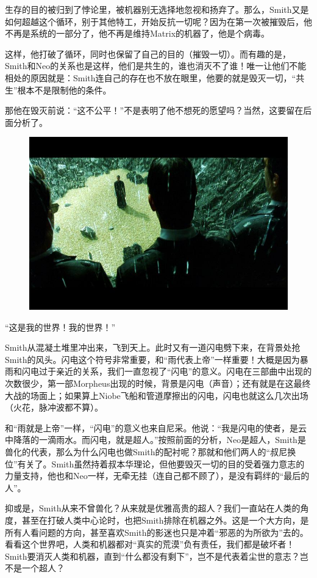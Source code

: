 \documentclass[UTF8]{ctexart}
\begin{document}
生存的目的被归到了悖论里，被机器别无选择地忽视和扬弃了。那么，Smith又是如何超越这个循环，别于其他特工，开始反抗一切呢？因为在第一次被摧毁后，他不再是系统的一部分了，他不再是维持Matrix的机器了，他是个病毒。

这样，他打破了循环，同时也保留了自己的目的（摧毁一切）。而有趣的是，Smith和Neo的关系也是这样，他们是共生的，谁也消灭不了谁！唯一让他们不能相处的原因就是：Smith连自己的存在也不放在眼里，他要的就是毁灭一切，“共生”根本不是限制他的条件。

那他在毁灭前说：“这不公平！”不是表明了他不想死的愿望吗？当然，这要留在后面分析了。

\begin{figure}[htb]
\centering
\includegraphics[width=0.5\linewidth]{fig/34e986d68bcb402c06088b7f.jpg}
\end{figure}

“这是我的世界！我的世界！”

Smith从混凝土堆里冲出来，飞到天上。此时又有一道闪电劈下来，在背景处抢Smith的风头。闪电这个符号非常重要，和“雨代表上帝”一样重要！大概是因为暴雨和闪电过于亲近的关系，我们一直忽视了“闪电”的意义。闪电在三部曲中出现的次数很少，第一部Morpheus出现的时候，背景是闪电（声音）；还有就是在这最终大战的场面上；如果算上Niobe飞船和管道摩擦出的闪电，闪电也就这么几次出场（火花，脉冲波都不算）。

和“雨就是上帝”一样，“闪电”的意义也来自尼采。他说：“我是闪电的使者，是云中降落的一滴雨水。而闪电，就是超人。”按照前面的分析，Neo是超人，Smith是兽化的代表，那么为什么闪电也做Smith的配衬呢？那就和他们两人的“叔尼换位”有关了。Smith虽然持着叔本华理论，但他要毁灭一切的目的受着强力意志的力量支持，他也和Neo一样，无牵无挂（连自己都不顾了），是没有羁绊的“最后的人”。

抑或是，Smith从来不曾兽化？从来就是优雅高贵的超人？我们一直站在人类的角度，甚至在打破人类中心论时，也把Smith排除在机器之外。这是一个大方向，是所有人看问题的方向，甚至喜欢Smith的影迷也只是冲着“邪恶的为所欲为”去的。看看这个世界吧，人类和机器都对“真实的荒漠”负有责任，我们都是破坏者！Smith要消灭人类和机器，直到“什么都没有剩下”，岂不是代表着尘世的意志？岂不是一个超人？
\end{document}
